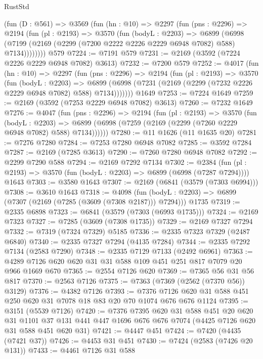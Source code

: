\begin{lexlean}{RustStd}
\begin{coremodule}
    (fun (D : @561) =>
    @3569
      (fun (hn : @10) =>
      @2297
        (fun (pns : @2296) =>
        @2194
          (fun (pl : @2193) =>
          @3570
            (fun (bodyL : @2203) =>
            @6899
              (@6998 (@7199 (@2169 (@2299 (@7200 @2222 @2226 @2229 @6948 @7082) @588) @7134))))))))
    @579
@7224 := @7191 @579
@7231 := @2169 (@3592 (@7224 @2226 @2229 @6948 @7082) @3613)
@7232 := @7200 @579
@7252 := @4017
    (fun (hn : @10) =>
    @2297
      (fun (pns : @2296) =>
      @2194
        (fun (pl : @2193) =>
        @3570
          (fun (bodyL : @2203) =>
          @6899 (@6998 (@7231 (@2169 (@2299 (@7232 @2226 @2229 @6948 @7082) @588) @7134)))))))
    @1649
@7253 := @7224 @1649
@7259 := @2169 (@3592 (@7253 @2229 @6948 @7082) @3613)
@7260 := @7232 @1649
@7276 := @4047
    (fun (pns : @2296) =>
    @2194
      (fun (pl : @2193) =>
      @3570
        (fun (bodyL : @2203) =>
        @6899 (@6998 (@7259 (@2169 (@2299 (@7260 @2229 @6948 @7082) @588) @7134))))))
@7280 := @11 @1626 (@11 @1635 @20)
@7281 := @7276 @7280
@7284 := @7253 @7280 @6948 @7082
@7285 := @3592 @7284
@7287 := @2169 (@7285 @3613)
@7290 := @7260 @7280 @6948 @7082
@7292 := @2299 @7290 @588
@7294 := @2169 @7292 @7134
@7302 := @2384
    (fun (pl : @2193) => @3570 (fun (bodyL : @2203) => @6899 (@6998 (@7287 @7294))))
    @1643
@7303 := @3580 @1643
@7307 := @2169 (@6841 (@3579 (@7303 @6994)))
@7308 := @3610 @1643
@7318 := @4098
    (fun (bodyL : @2203) => @6899 (@7307 (@2169 (@7285 (@3609 (@7308 @2187))) @7294)))
    @1735
@7319 := @2335 @6898
@7323 := @6841 (@3579 (@7303 (@6993 @1735)))
@7324 := @2169 @7323
@7327 := @7285 (@3609 (@7308 @1735))
@7329 := @2169 @7327 @7294
@7332 := @7319 (@7324 @7329) @5185
@7336 := @2335 @7323 @7329 (@2487 @6840)
@7340 := @2335 @7327 @7294 (@4135 @7284)
@7344 := @2335 @7292 @7134 (@2583 @7290)
@7348 := @2335 @7129 @7133 (@2492 @6961)
@7363 := @4289 @7126 @620 @620 @31 @31 @588 @109 @451 @251 @817 @7079 @20 @966 @1669 @670
@7365 := @2554 @7126 @620
@7369 := @7365 @56 @31 @56 @817
@7370 := @2563 @7126
@7375 := @7363 (@7369 (@2562 (@7370 @56)) @3129)
@7376 := @4382 @7126
@7393 := @7376 @7126 @620 @31 @588 @451 @250 @620 @31 @7078 @18 @83 @20 @70 @1074 @676 @676 @1124
@7395 := @3151 (@5539 @7126)
@7420 := @7376
    @7395
    @620
    @31
    @588
    @451
    @20
    @620
    @31
    @1101
    @37
    @131
    @441
    @447
    @1696
    @676
    @676
    @7074
    (@4425 @7126 @620 @31 @588 @451 @620 @31)
@7421 := @4447 @451
@7424 := @7420 (@4435 (@7421 @37))
@7426 := @4453 @31 @451
@7430 := @7424 (@2583 (@7426 @20 @131))
@7433 := @4461 @7126 @31 @588

\end{coremodule}
\end{lexlean}
